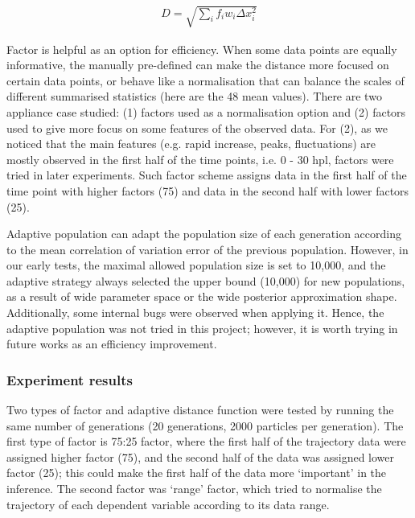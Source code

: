 \begin{align}
    \label{dis_f}
    D=\sqrt{\sum_i f_iw_i \Delta x_i^2}
\end{align}

Factor is helpful as an option for efficiency. When some data points are equally informative, the manually pre-defined can make the distance more focused on certain data points, or behave like a normalisation that can balance the scales of different summarised statistics (here are the 48 mean values). There are two appliance case studied: (1) factors used as a normalisation option and (2) factors used to give more focus on some features of the observed data. For (2), as we noticed that the main features (e.g. rapid increase, peaks, fluctuations) are mostly observed in the first half of the time points, i.e. 0 - 30 hpl, factors were tried in later experiments. Such factor scheme assigns data in the first half of the time point with higher factors (75) and data in the second half with lower factors (25).

Adaptive population \cite{population} can adapt the population size of each generation according to the mean correlation of variation error of the previous population. However, in our early tests,  the maximal allowed population size is set to 10,000, and the adaptive strategy always selected the upper bound (10,000) for new populations, as a result of wide parameter space or the wide posterior approximation shape. Additionally, some internal bugs were observed when applying it. Hence, the adaptive population was not tried in this project; however, it is worth trying in future works as an efficiency improvement.



\subsubsection{Experiment results}


Two types of factor and adaptive distance function were tested by running the same number of generations (20 generations, 2000 particles per generation). The first type of factor is 75:25 factor, where the first half of the trajectory data were assigned higher factor (75), and the second half of the data was assigned lower factor (25); this could make the first half of the data more `important' in the inference. The second factor was `range' factor, which tried to normalise the trajectory of each dependent variable according to its data range.

